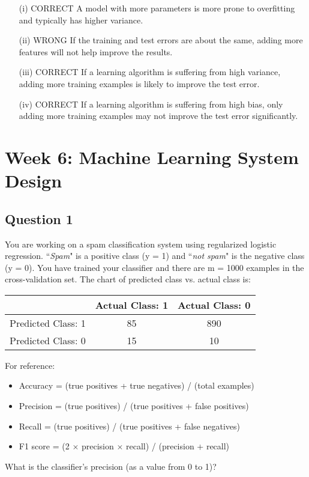 \documentclass[11pt]{article} %
\begin{document}
\begin{itemize}
	\item[(i)]
CORRECT A model with more parameters is more prone to overfitting and typically has higher variance. 
	\item[(ii)]
WRONG If the training and test errors are about the same, adding more features will not help improve the results. 
	\item[(iii)]
CORRECT If a learning algorithm is suffering from high variance, adding more training examples is likely to improve the test error.
	\item[(iv)]
CORRECT If a learning algorithm is suffering from high bias, only adding more training examples may not improve the test error significantly.
\end{itemize}
\newpage
\section*{Week 6: Machine Learning System Design}

\subsection*{Question 1} 
You are working on a spam classification system using regularized logistic regression. ``\textit{Spam}" is a positive class (y = 1) and ``\textit{not spam}" is the negative class (y = 0). You have trained your classifier and there are m = 1000 examples in the cross-validation set. The chart of predicted class vs. actual class is:

\begin{center}
\begin{tabular}{|c|c|c|}\hline 
	& Actual Class: 1	& Actual Class: 0 \\ \hline
	Predicted Class: 1 &	85&	890 \\  \hline  
	Predicted Class: 0 &	15&	10\\ \hline
\end{tabular} 
\end{center}


\begin{framed}
For reference:

\begin{itemize}
	\item Accuracy = (true positives + true negatives) / (total examples)
	\item Precision = (true positives) / (true positives + false positives)
	\item Recall = (true positives) / (true positives + false negatives)
	\item F1 score = (2 $\times$ precision $\times$ recall) / (precision + recall)
\end{itemize}

\end{framed}
What is the classifier's precision (as a value from 0 to 1)?
\end{document}
